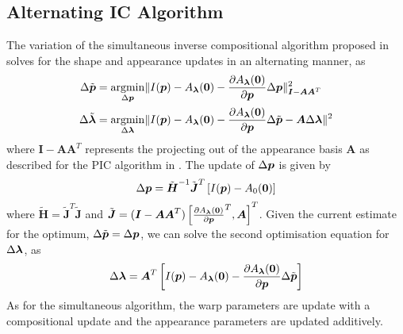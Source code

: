 \subsection{Alternating IC Algorithm}\label{subsec:aam-alternating}
The variation of the simultaneous inverse compositional algorithm proposed in \cite{RefWorks:277} solves for the shape and appearance updates in an alternating manner, as
\begin{equation}
    \begin{aligned}\label{eq:aam-alternating}
        \Delta \tilde{\p} &=       \argmin_{\Delta \p}       \norm{I(\p) - A_{\blambda}(\zero) - \frac{\partial A_{\blambda}(\zero)}{\partial \p} \Delta \p}^2_{\boldsymbol{I} - \boldsymbol{A} \boldsymbol{A}^T} \\
        \Delta \tilde{\blambda} &= \argmin_{\Delta \blambda} \norm{I(\p) - A_{\blambda}(\zero) - \frac{\partial A_{\blambda}(\zero)}{\partial \p} \Delta \tilde{\p} - \boldsymbol{A} \Delta \blambda}^2
    \end{aligned}
\end{equation}
where $\boldsymbol{I} - \boldsymbol{A} \boldsymbol{A}^T$ represents the projecting out of the appearance basis $\boldsymbol{A}$ as described for the PIC algorithm in \cite{RefWorks:227}. The update of $\Delta \boldsymbol{p}$ is given by
\begin{equation}\label{eq:aam-alternating-deltap-update}
        \Delta \p = {\tilde{\boldsymbol{H}}}^{-1} {\tilde{\boldsymbol{J}}}^{T} \left[ I(\p) - A_0(\zero) \right]
\end{equation}
where ${\tilde{\boldsymbol{H}}} = {\tilde{\boldsymbol{J}}}^{T} \tilde{\boldsymbol{J}}$ and $\tilde{\boldsymbol{J}} = (\boldsymbol{I} - \boldsymbol{A} \boldsymbol{A}^T) \left[ {\frac{\partial A_{\boldsymbol{\lambda}}(\boldsymbol{0})}{\partial \boldsymbol{p}}}^T, \boldsymbol{A} \right]^T$. Given the current estimate for the optimum, $\Delta \tilde{\boldsymbol{p}} = \Delta \boldsymbol{p}$, we can solve the second optimisation equation for $\Delta \boldsymbol{\lambda}$, as
\begin{equation}\label{eq:aam-alternating-deltalambda-update}
        \Delta \blambda = \boldsymbol{A}^T \left[ I(\p) - A_{\blambda}(\zero) - \frac{\partial A_{\blambda}(\zero)}{\partial \p} \Delta \tilde{\p} \right]
\end{equation}
As for the simultaneous algorithm, the warp parameters are update with a compositional update and the appearance parameters are updated additively.
